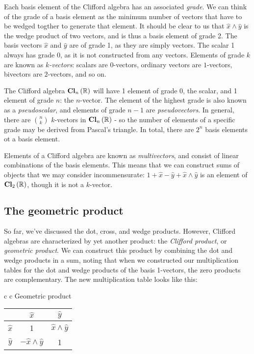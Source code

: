 Each basis element of the Clifford algebra has an associated \textit{grade}. We can think of the
grade of a basis element as the minimum number of vectors that have to be wedged togther to generate
that element. It should be clear to us that $\hat{x} \wedge \hat{y}$ is the wedge product of two
vectors, and is thus a basis element of grade 2. The basis vectors $\hat{x}$ and $\hat{y}$ are of
grade 1, as they are simply vectors. The scalar 1 always has grade 0, as it is not constructed from
any vectors. Elements of grade $k$ are known as \textit{$k$-vectors}: scalars are $0$-vectors, 
ordinary vectors are $1$-vectors, bivectors are $2$-vectors, and so on.

The Clifford algebra $\operatorname{\mathbf{Cl}}_{n}\left(\mathbb{R}\right)$ will have 1 element of grade 0, the scalar, and 1 element of grade
$n$: the $n$-vector. The element of the highest grade is also known as a \textit{pseudoscalar}, and
elements of grade $n-1$ are \textit{pseudovectors}. In general, there are $\binom{n}{k}$ $k$-vectors
in $\operatorname{\mathbf{Cl}}_{n}\left(\mathbb{R}\right)$ - so the number of elements of a specific grade may be derived from Pascal's triangle.
In total, there are $2^n$ basis elements ot a basis element.

Elements of a Clifford algebra are known as \textit{multivectors}, and consist of linear
combinations of the basis elements. This means that we can construct sums of objects that we may
consider incommensurate: $1 + \hat{x} - \hat{y} + \hat{x} \wedge \hat{y}$ is an element of
$\operatorname{\mathbf{Cl}}_{2}\left(\mathbb{R}\right)$, though it is not a $k$-vector.

\subsection{The geometric product}

So far, we've discussed the dot, cross, and wedge products. However, Clifford algebras are
characterized by yet another product: the \textit{Clifford product}, or \textit{geometric product}.
We can construct this product by combining the dot and wedge products in a sum, noting that when we
constructed our multiplication tables for the dot and wedge products of the basis 1-vectors, the
zero products are complementary. The new multiplication table looks like this:

\begin{center}
    \begin{tabular}{c c}
        Geometric product \\
        \begin{tabular}{ c | c  c }
                        & $\hat{x}$                 & $\hat{y}$                 \\ \hline
            $\hat{x}$   & 1                         & $\hat{x} \wedge \hat{y}$  \\
            $\hat{y}$   & $-\hat{x} \wedge \hat{y}$ & 1                         \\
        \end{tabular} \\
    \end{tabular} 
\end{center}

